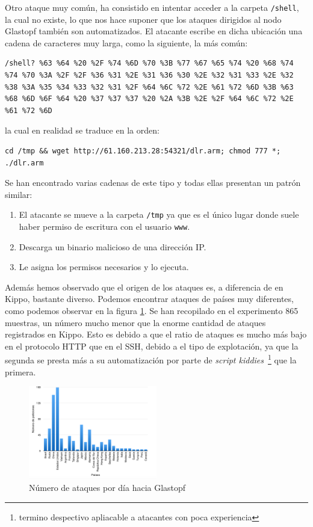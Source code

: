 \documentclass[journal]{IEEEtran}
\begin{document}
Otro ataque muy común, ha consistido en intentar acceder a la carpeta {\tt /shell}, la cual no existe, lo que nos hace suponer que los ataques dirigidos al nodo Glastopf también son automatizados. El atacante escribe en dicha ubicación una cadena de caracteres muy larga, como la siguiente, la más común:

\begin{lstlisting}
/shell? %63 %64 %20 %2F %74 %6D %70 %3B %77 %67 %65 %74 %20 %68 %74 %74 %70 %3A %2F %2F %36 %31 %2E %31 %36 %30 %2E %32 %31 %33 %2E %32 %38 %3A %35 %34 %33 %32 %31 %2F %64 %6C %72 %2E %61 %72 %6D %3B %63 %68 %6D %6F %64 %20 %37 %37 %37 %20 %2A %3B %2E %2F %64 %6C %72 %2E %61 %72 %6D
\end{lstlisting}
la cual en realidad se traduce en la orden:
\lstset{basicstyle=\small\ttfamily, breaklines=true}
\begin{lstlisting}
cd /tmp && wget http://61.160.213.28:54321/dlr.arm; chmod 777 *; ./dlr.arm
\end{lstlisting}

Se han encontrado varias cadenas de este tipo y todas ellas presentan un patrón similar:
\begin{enumerate}
\item El atacante se mueve a la carpeta {\tt /tmp} ya que es el único lugar donde suele haber permiso de escritura con el usuario {\tt www}.
\item Descarga un binario malicioso de una dirección IP.
\item Le asigna los permisos necesarios y lo ejecuta.
\end{enumerate}

Además hemos observado que el origen de los ataques es, a diferencia de en Kippo, bastante diverso. Podemos encontrar ataques de países muy diferentes, como podemos observar en la figura \ref{fig:glastopf}. Se han recopilado en el experimento 865 muestras, un número mucho menor que la enorme cantidad de ataques registrados en Kippo. Esto es debido a que el ratio de ataques es mucho más bajo en el protocolo HTTP que en el SSH, debido a el tipo de explotación, ya que la segunda se presta más a su automatización por parte de {\it script kiddies}~\footnote{termino despectivo apliacable a atacantes con poca experiencia} que la primera.

\begin{figure}[H]
\centerline{
\includegraphics[width=0.5\textwidth]{img/glastopf}
}
\caption{Número de ataques por día hacia Glastopf}
\label{fig:glastopf}
\end{figure}
\end{document}
